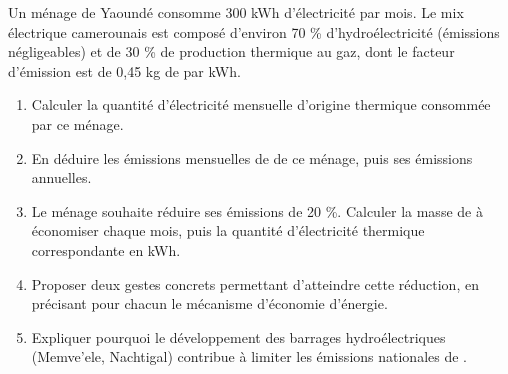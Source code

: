 \documentclass[11pt]{article}
\begin{document}
\begin{exercice}
Un ménage de Yaoundé consomme 300 kWh d'électricité par mois. Le mix électrique camerounais est composé d'environ 70 \% d'hydroélectricité (émissions négligeables) et de 30 \% de production thermique au gaz, dont le facteur d'émission est de 0,45 kg de  par kWh.
\begin{enumerate}
\item Calculer la quantité d'électricité mensuelle d'origine thermique consommée par ce ménage.
\item En déduire les émissions mensuelles de  de ce ménage, puis ses émissions annuelles.
\item Le ménage souhaite réduire ses émissions de 20 \%. Calculer la masse de  à économiser chaque mois, puis la quantité d'électricité thermique correspondante en kWh.
\item Proposer deux gestes concrets permettant d'atteindre cette réduction, en précisant pour chacun le mécanisme d'économie d'énergie.
\item Expliquer pourquoi le développement des barrages hydroélectriques (Memve'ele, Nachtigal) contribue à limiter les émissions nationales de .
\end{enumerate}
\end{exercice}
\end{document}
